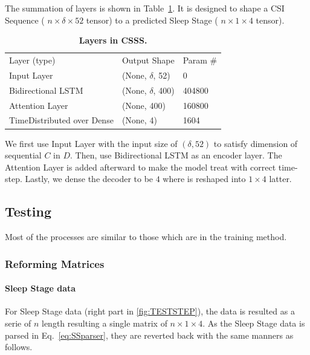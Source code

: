 \documentclass[10pt,letterpaper]{article}
\newlength\savedwidth
\newcommand\thickhline{\noalign{\global\savedwidth\arrayrulewidth\global\arrayrulewidth 2pt}%
	\hline
	\noalign{\global\arrayrulewidth\savedwidth}}
\begin{document}
	The summation of layers is shown in Table~\ref{table:CSPS}.
	It is designed to shape a CSI Sequence ( $n \times \delta \times 52$ tensor) to a predicted Sleep Stage ( $n \times 1 \times 4$ tensor).
	
	\begin{table}[!ht]
		\begin{adjustwidth}{-2.25in}{0in} %
			\centering
			\caption{
				{\bf Layers in CSSS.}}
			\begin{tabular}{lll}
				\hline
				Layer (type)       & Output Shape     & Param \# \\ 
				\thickhline
				Input Layer & (None, $\delta$, 52)      & 0   \\
				Bidirectional LSTM & (None, $\delta$, 400)  & 404800   \\
				Attention Layer       & (None, 400)  & 160800       \\
				TimeDistributed over Dense    & (None, 4) & 1604   \\ \hline
			\end{tabular}
			
			\begin{flushleft} 
			\end{flushleft}
			\label{table:CSPS}
		\end{adjustwidth}
	\end{table}
	
	We first use Input Layer with the input size of $(\delta,52)$ to satisfy dimension of sequential $C$ in $D$.
	Then, use Bidirectional LSTM as an encoder layer. The Attention Layer is added afterward to make the model treat with correct time-step. Lastly, we dense the decoder to be $4$ where is reshaped into $1\times 4$ latter.
	
	
	\subsection*{Testing}
		Most of the processes are similar to those which are in the training method.
		
		
		\subsubsection*{Reforming Matrices}
	
	\paragraph{Sleep Stage data}
	For Sleep Stage data (right part in \ref{fig:TESTSTEP}), the data is resulted as a serie of  $n$ length resulting a single matrix of  $n \times 1 \times 4$. As the Sleep Stage data is parsed in Eq.~\ref{eq:SSparser}, they are reverted back with the same manners as follows.
	
\end{document}
